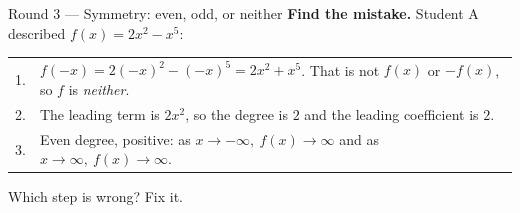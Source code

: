 \documentclass[12pt]{article}
\begin{document}
\begin{notesbox}{Round 3 --- Symmetry: even, odd, or neither}
\textbf{Find the mistake.} Student A described $f(x)=2x^2-x^5$:
\begin{center}
\begin{tabular}{@{}r@{\;}l@{}}
1. & $f(-x)=2(-x)^2-(-x)^5=2x^2+x^5$. That is not $f(x)$ or $-f(x)$, so $f$ is \emph{neither}. \\
2. & The leading term is $2x^2$, so the degree is $2$ and the leading coefficient is $2$. \\
3. & Even degree, positive: as $x\to-\infty,\ f(x)\to\infty$ and as $x\to\infty,\ f(x)\to\infty$. \\
\end{tabular}
\end{center}
Which step is wrong? Fix it.\par
{}
\end{notesbox}
\end{document}
